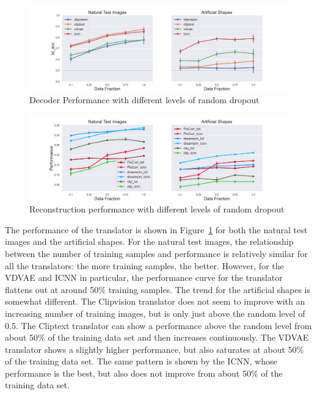 
\begin{figure}[ht]
    \centering
    \includegraphics[width=1\textwidth]{plots/dropout_random_translator.png}
    \caption{Decoder Performance with different levels of random dropout}\label{fig:dropout_random_translator}
\end{figure}

\begin{figure}[ht]
    \centering
    \includegraphics[width=1\textwidth]{plots/dropout_random_reconstruction.png}
    \caption{Reconstruction performance with different levels of random dropout}\label{fig:dropout_random_reconstruction}
\end{figure}

The performance of the translator is shown in Figure~\ref{fig:dropout_random_translator} for both the natural test images and the artificial shapes. For the natural test images, the relationship between the number of training samples and performance is relatively similar for all the translators: the more training samples, the better. However, for the VDVAE and ICNN in particular, the performance curve for the translator flattens out at around 50\% training samples. The trend for the artificial shapes is somewhat different. The Clipvision translator does not seem to improve with an increasing number of training images, but is only just above the random level of 0.5. The Cliptext translator can show a performance above the random level from about 50\% of the training data set and then increases continuously. The VDVAE translator shows a slightly higher performance, but also saturates at about 50\% of the training data set. The same pattern is shown by the ICNN, whose performance is the best, but also does not improve from about 50\% of the training data set. 

